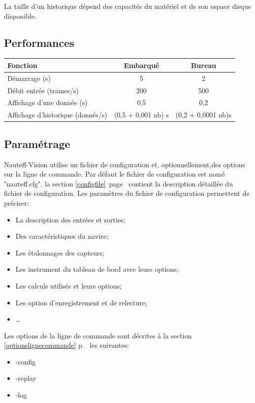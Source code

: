 \documentclass[a4paper,11pt]{report}
\newcommand{\myref}[1]{\ref{#1} p.\ \pageref{#1}}
\begin{document}
La taille d'un historique dépend des capacités du matériel et de son espace disque disponible.


\subsection{Performances}

\begin{tabular}{|l|c|c|}
	\hline
	Fonction & Embarqué &  Bureau\\
	\hline
	Démarrage (s) & 5 & 2 \\
	\hline
	Débit entrée (trames/s) & 200  &  500 \\
	\hline
    Affichage d'une donnée (s) & 0,5 &  0,2\\
	\hline
	Affichage d'historique (donnés/s)& (0,5 + 0,001 nb) s &  (0,2 + 0,0001 nb)s\\
	\hline
\end{tabular}

\subsection{Paramétrage}

Nauteff-Vision utilise un fichier de configuration et,
optionnellement,des options sur la ligne de commande.
Par défaut le fichier de configuration est nomé "nauteff.cfg". 
la section \ref{configfile}\ page\ \pageref{configfile} contient la description détaillée
du fichier de configuration.
Les paramètres du fichier de configuration permettent de préciser:
\begin{itemize}
    \item La description des entrées et sorties;
    \item Des caractéristiques du navire;
    \item Les étalonnages des capteurs;
    \item Les instrument du tableau de bord avec leurs options;
    \item Les calculs utilisés et leurs options;
    \item Les option d'enregistrement et de relecture;
    \item \dots
\end{itemize}
Les options de la ligne de commande sont décrites à la section \myref{optionslignecommande}
les suivantes:
\begin{itemize}
  \item[] -config
  \item[] -replay
  \item[] -log
\end{itemize}
\end{document}
